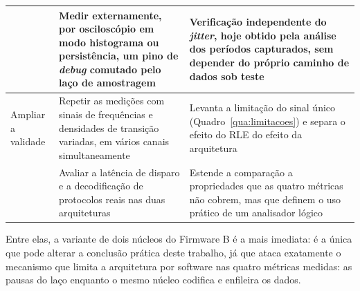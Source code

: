 \begin{quadro}[H]
\begin{tabularx}{\linewidth}{|>{\raggedright\arraybackslash}p{2.1cm}|>{\raggedright\arraybackslash}X|>{\raggedright\arraybackslash}X|}
                    & Medir externamente, por osciloscópio em modo histograma ou persistência, um pino de \emph{debug} comutado pelo laço de amostragem
                    & Verificação independente do \emph{jitter}, hoje obtido pela análise dos períodos capturados, sem depender do próprio caminho de dados sob teste                                                                         \\ \hline
    Ampliar a validade
                    & Repetir as medições com sinais de frequências e densidades de transição variadas, em vários canais simultaneamente
                    & Levanta a limitação do sinal único (Quadro~\ref{qua:limitacoes}) e separa o efeito do \ac{RLE} do efeito da arquitetura                                                                                                 \\ \cline{2-3}
                    & Avaliar a latência de disparo e a decodificação de protocolos reais nas duas arquiteturas
                    & Estende a comparação a propriedades que as quatro métricas não cobrem, mas que definem o uso prático de um analisador lógico                                                                                            \\ \hline
  \end{tabularx}
\end{quadro}

Entre elas, a variante de dois núcleos do Firmware B é a mais imediata: é a
única que pode alterar a conclusão prática deste trabalho, já que ataca
exatamente o mecanismo que limita a arquitetura por software nas quatro
métricas medidas: as pausas do laço enquanto o mesmo núcleo codifica e
enfileira os dados.

